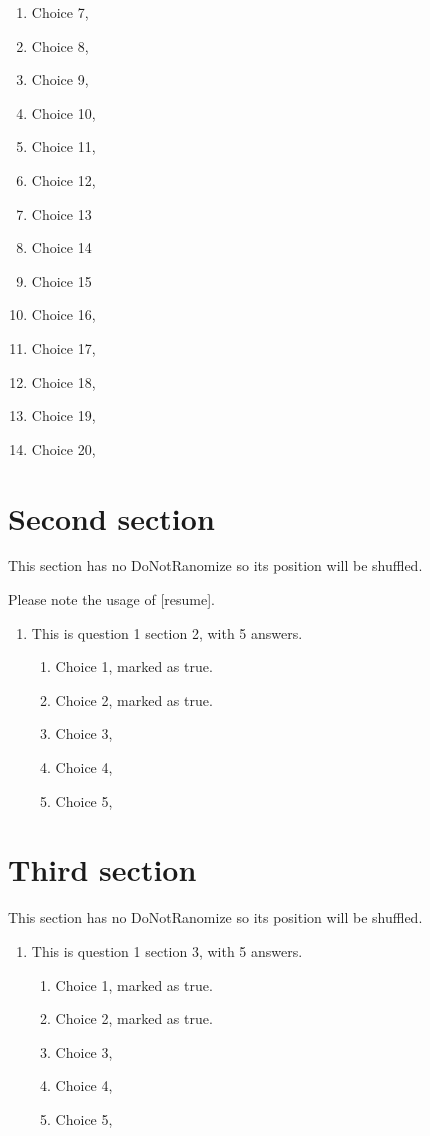 \documentclass[a4paper,10pt]{article}%
\begin{document}
\begin{enumerate}
\begin{enumerate}
		\item Choice 7,
		\item Choice 8,
		\item Choice 9,
		\item Choice 10,
		\item Choice 11,
		\item Choice 12,
		\item Choice 13
		\item Choice 14
		\item Choice 15
		\item Choice 16,
		\item Choice 17,
		\item Choice 18,
		\item Choice 19,		
		\item Choice 20, %
	\end{enumerate}
	
\end{enumerate}


\section{Second section}
This section has no DoNotRanomize so its position will be shuffled.

Please note the usage of [resume].
\begin{enumerate}[resume]
	\item This is question 1 section 2, with 5 answers.
	\begin{enumerate}
		\item Choice 1, marked as true. %
		\item Choice 2, marked as true. %
		\item Choice 3, 
		\item Choice 4,
		\item Choice 5,
	\end{enumerate}
\end{enumerate}



\section{Third section}
This section has no DoNotRanomize so its position will be shuffled.
\begin{enumerate}[resume]
	\item This is question 1 section 3, with 5 answers.
	\begin{enumerate}
		\item Choice 1, marked as true. %
		\item Choice 2, marked as true. %
		\item Choice 3, 
		\item Choice 4,
		\item Choice 5,
	\end{enumerate}
\end{enumerate}
\end{document}
